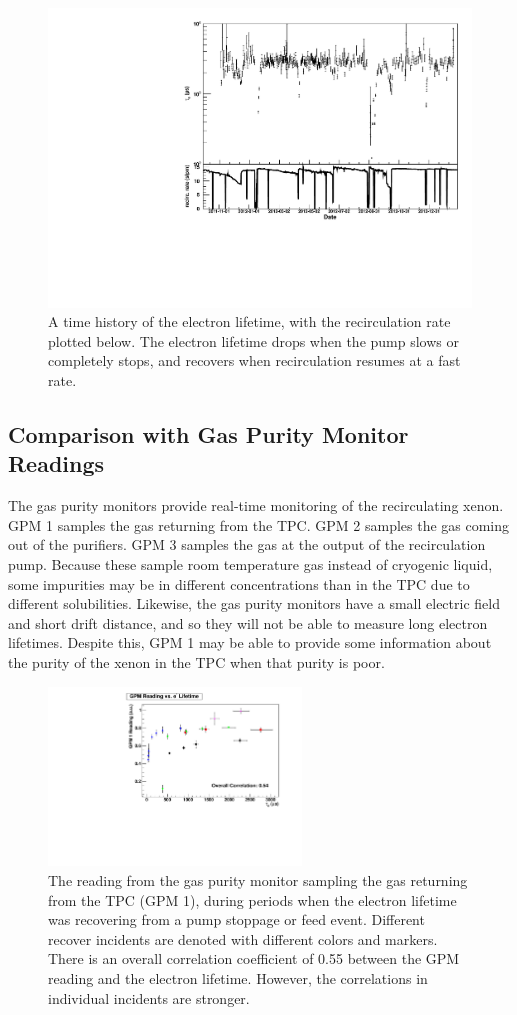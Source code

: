 \documentclass[herrin-thesis.tex]{subfiles}
\begin{document}
\begin{figure}[htb]
\centering
\includegraphics[width=0.6\columnwidth]{./plots/el_and_recirculation.pdf}
\caption[Electron lifetime history with recirculation rate]{A time history of the electron lifetime, with the recirculation rate plotted below. The electron lifetime drops when the pump slows or completely stops, and recovers when recirculation resumes at a fast rate.}
\label{fig:el_and_recirculation}
\end{figure}

\subsection{Comparison with Gas Purity Monitor Readings}
The gas purity monitors\cite{Dobi:2011zr} provide real-time monitoring of the recirculating xenon. GPM 1 samples the gas returning from the TPC. GPM 2 samples the gas coming out of the purifiers. GPM 3 samples the gas at the output of the recirculation pump. Because these sample room temperature gas instead of cryogenic liquid, some impurities may be in different concentrations than in the TPC due to different solubilities. Likewise, the gas purity monitors have a small electric field and short drift distance, and so they will not be able to measure long electron lifetimes. Despite this, GPM 1 may be able to provide some information about the purity of the xenon in the TPC when that purity is poor.

\begin{figure}[htb]
\centering
\includegraphics[width=0.6\textwidth]{./plots/el_gpm_vs_el.pdf}
\caption[GPM reading vs. electron lifetime]{The reading from the gas purity monitor sampling the gas returning from the TPC (GPM 1), during periods when the electron lifetime was recovering from a pump stoppage or feed event. Different recover incidents are denoted with different colors and markers. There is an overall correlation coefficient of 0.55 between the GPM reading and the electron lifetime. However, the correlations in individual incidents are stronger.}
\label{fig:el_gpm_vs_el}
\end{figure}
\end{document}
